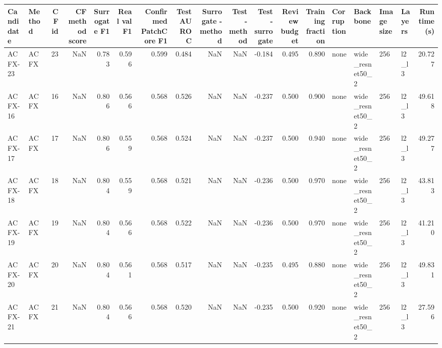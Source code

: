 \begin{tabular}{llrrrrrrrrrrrllllr}
\toprule
Candidate & Method &  CF id &  CF method score &  Surrogate F1 &  Real val F1 &  Confirmed PatchCore F1 &  Test AUROC &  Surrogate - method &  Test - method &  Test - surrogate &  Review budget &  Training fraction & Corruption &        Backbone & Image size & Layers &  Runtime (s) \\
\midrule
  ACFX-23 &   ACFX &     23 &              NaN &         0.783 &        0.596 &                   0.599 &       0.484 &                 NaN &            NaN &            -0.184 &          0.495 &              0.890 &       none & wide\_resnet50\_2 &        256 &  l2\_l3 &       20.727 \\
  ACFX-16 &   ACFX &     16 &              NaN &         0.806 &        0.566 &                   0.568 &       0.526 &                 NaN &            NaN &            -0.237 &          0.500 &              0.900 &       none & wide\_resnet50\_2 &        256 &  l2\_l3 &       49.618 \\
  ACFX-17 &   ACFX &     17 &              NaN &         0.806 &        0.559 &                   0.568 &       0.524 &                 NaN &            NaN &            -0.237 &          0.500 &              0.940 &       none & wide\_resnet50\_2 &        256 &  l2\_l3 &       49.277 \\
  ACFX-18 &   ACFX &     18 &              NaN &         0.804 &        0.559 &                   0.568 &       0.521 &                 NaN &            NaN &            -0.236 &          0.500 &              0.970 &       none & wide\_resnet50\_2 &        256 &  l2\_l3 &       43.813 \\
  ACFX-19 &   ACFX &     19 &              NaN &         0.804 &        0.566 &                   0.568 &       0.522 &                 NaN &            NaN &            -0.236 &          0.500 &              0.970 &       none & wide\_resnet50\_2 &        256 &  l2\_l3 &       41.210 \\
  ACFX-20 &   ACFX &     20 &              NaN &         0.804 &        0.561 &                   0.568 &       0.517 &                 NaN &            NaN &            -0.235 &          0.495 &              0.880 &       none & wide\_resnet50\_2 &        256 &  l2\_l3 &       49.831 \\
  ACFX-21 &   ACFX &     21 &              NaN &         0.804 &        0.566 &                   0.568 &       0.520 &                 NaN &            NaN &            -0.235 &          0.500 &              0.920 &       none & wide\_resnet50\_2 &        256 &  l2\_l3 &       27.596 \\

\end{tabular}
